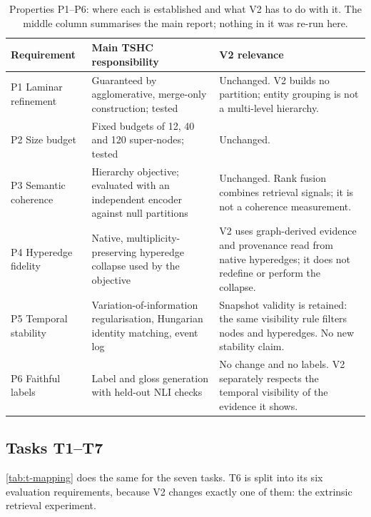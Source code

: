 \documentclass[11pt,a4paper]{article}
\newcommand{\Cref}[1]{\autoref{#1}}
\theoremstyle{remark}
\begin{document}
\begin{table}[H]
\centering
\caption[Properties P1--P6 and their relation to V2]{Properties P1--P6: where each is established and what V2 has to do with it.
The middle column summarises the main report; nothing in it was re-run here.}
\label{tab:p-mapping}
\small
\begin{tabularx}{\linewidth}{lp{5.0cm}X}
\toprule
Requirement & Main TSHC responsibility & V2 relevance\\
\midrule
P1 Laminar refinement & Guaranteed by agglomerative, merge-only construction; tested &
  Unchanged. V2 builds no partition; entity grouping is not a multi-level hierarchy.\\
P2 Size budget & Fixed budgets of 12, 40 and 120 super-nodes; tested &
  Unchanged.\\
P3 Semantic coherence & Hierarchy objective; evaluated with an independent encoder
  against null partitions &
  Unchanged. Rank fusion combines retrieval signals; it is not a coherence measurement.\\
P4 Hyperedge fidelity & Native, multiplicity-preserving hyperedge collapse used by the
  objective &
  V2 uses graph-derived evidence and provenance read from native hyperedges; it does not
  redefine or perform the collapse.\\
P5 Temporal stability & Variation-of-information regularisation, Hungarian identity
  matching, event log &
  Snapshot validity is retained: the same visibility rule filters nodes and hyperedges.
  No new stability claim.\\
P6 Faithful labels & Label and gloss generation with held-out NLI checks &
  No change and no labels. V2 separately respects the temporal visibility of the evidence
  it shows.\\
\bottomrule
\end{tabularx}
\end{table}

\subsection{Tasks T1--T7}

\Cref{tab:t-mapping} does the same for the seven tasks. T6 is split into its six
evaluation requirements, because V2 changes exactly one of them: the extrinsic retrieval
experiment.
\end{document}

